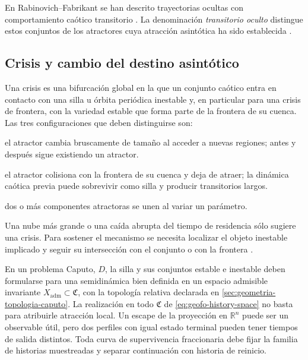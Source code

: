 En Rabinovich--Fabrikant se han descrito trayectorias ocultas con
comportamiento caótico transitorio \cite{Danca2016HiddenTransient}.
La denominación \emph{transitorio oculto} distingue estos conjuntos de los
atractores cuya atracción asintótica ha sido establecida
\cite{GuanXie2025}.

\subsection{Crisis y cambio del destino asintótico}

Una crisis es una bifurcación global en la que un conjunto caótico entra en
contacto con una silla u órbita periódica inestable y, en particular para una
crisis de frontera, con la variedad estable que forma parte de la frontera de
su cuenca. Las tres configuraciones que deben distinguirse son:
\begin{description}[style=nextline,leftmargin=3.5em]
 \item[Crisis interior] el atractor cambia bruscamente de tamaño al acceder a
 nuevas regiones; antes y después sigue existiendo un atractor.
 \item[Crisis de frontera] el atractor colisiona con la frontera de su cuenca
 y deja de atraer; la dinámica caótica previa puede sobrevivir como silla y
 producir transitorios largos.
 \item[Crisis de fusión] dos o más componentes atractoras se unen al variar un
 parámetro.
\end{description}
Una nube más grande o una caída abrupta del tiempo de residencia sólo sugiere
una crisis. Para sostener el mecanismo se necesita localizar el objeto
inestable implicado y seguir su intersección con el conjunto o con la frontera
\cite{Ott2002Chaos,TelGruiz2006Chaotic}.

En un problema Caputo, \(D\), la silla y sus conjuntos estable e inestable
deben formularse para una semidinámica bien definida en un espacio admisible
invariante \(X_{\mathrm{adm}}\subset\mathfrak C\), con la topología relativa
declarada en \cref{sec:geometria-topologia-caputo}. La realización en todo
\(\mathfrak C\) de \cref{eq:geofo-history-space} no basta para atribuirle
atracción local. Un escape de la proyección en
\(\mathbb R^n\) puede ser un observable útil, pero dos perfiles con igual
estado terminal pueden tener tiempos de salida distintos. Toda curva de
supervivencia fraccionaria debe fijar la familia de historias muestreadas y
separar continuación con historia de reinicio.

